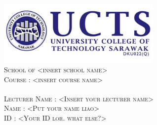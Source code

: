 	\begin{center}
	
		\includegraphics[width=0.6\textwidth]{logo}\\[2.0cm]    
	
		\textsc{\LARGE School of <insert school name>}\\[1.0cm]
	
		\textsc{\Large Course : <insert course name>}\\[0.75cm]

		\textsc{\large <Insert assignment title>}\\[1.0cm]

		\textsc{\large Lecturer Name : <Insert your lecturer name>}\\[4.0cm]
		
		\textsc{\large Name : <Put your name liao>}\\[1.0cm]
		
		\textsc{\large ID : <Your ID lor. what else?>}
	\end{center}


	\begin{center}

		\vfill

		
	\end{center}
	
